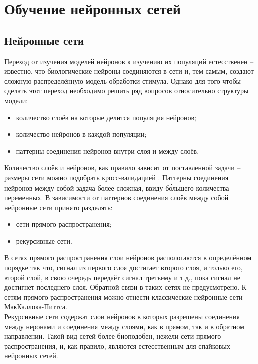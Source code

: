 \documentclass[a4paper,10pt]{article}
\begin{document}
\section{Обучение нейронных сетей}
\subsection{Нейронные сети}
\indent Переход от изучения моделей нейронов к изучению их популяций естесственен -- известно, что биологические нейроны соединяются в сети и, тем самым, создают сложную распределённую модель обработки стимула. Однако для того чтобы сделать этот переход необходимо решить ряд вопросов относительно структуры модели:
\begin{itemize}
\item количество слоёв на которые делится популяция нейронов;
\item количество нейронов в каждой популяции;
\item паттерны соединения нейронов внутри слоя и между слоёв.
\end{itemize}
\indent Количество слоёв и нейронов, как правило зависит от поставленной задачи -- размеры сети можно подобрать кросс-валидацией \cite{krogh1995neural}. Паттерны соединения нейронов между собой задача более сложная, ввиду б\'{о}льшего количества переменных. В зависимости от паттернов соединения слоёв между собой нейронные сети принято разделять:
\begin{itemize}
\item сети прямого распространения;
\item рекурсивные сети.
\end{itemize}
В сетях прямого распространения слои нейронов распологаются в определённом порядке так что, сигнал из первого слоя достигает второго слоя, и только его, второй слой, в свою очередь передаёт сигнал третьему и т.д., пока сигнал не достигнет последнего слоя. Обратной связи в таких сетях не предусмотрено. К сетям прямого распространения можно отнести классические нейронные сети МакКаллока-Питтса.\\
\indent Рекурсивные сети содержат слои нейронов в которых разрешены соединения между неронами и соединения между слоями, как в прямом, так и в обратном направлении. Такой вид сетей более биоподобен, нежели сети прямого распространения, и, как правило, являются естесственным для спайковых нейронных сетей.\\
\end{document}
